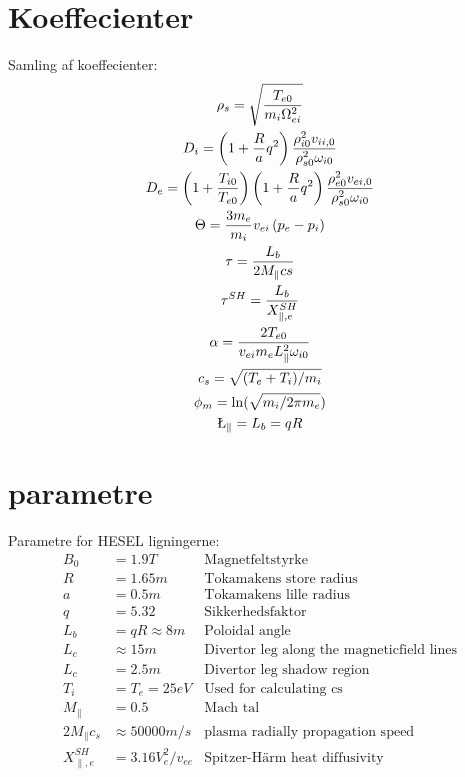 \documentclass{article}
\begin{document}
\section{Koeffecienter}
Samling af koeffecienter:
\begin{gather*}
    \rho_s = \sqrt{\frac{T_{e0}}{m_i\Omega_{ei}^2}}\\
    D_i = \left(1 + \frac{R}{a}q^2\right)\frac{\rho_{i0}^2v_{ii,0}}{\rho_{s0}^2\omega_{i0}}\\
    D_e = \left(1 + \frac{T_{i0}}{T_{e0}}\right) \left(1 + \frac{R}{a}q^2\right)\frac{\rho_{e0}^2v_{ei,0}}{\rho_{s0}^2\omega_{i0}}\\
    \Theta = \frac{3m_e}{m_i}v_{ei}\left(p_e - p_i\right)\\
    \tau = \frac{L_b}{2M_\parallel cs} \\
    \tau^{SH} = \frac{L_b}{X_{\parallel,e}^{SH}} \\
    \alpha = \frac{2T_{e0}}{v_{ei}m_eL^2_\parallel\omega_{i0}}\\
    c_s = \sqrt{(T_e + T_i)/m_i} \\
    \phi_m = \ln(\sqrt{m_i/2\pi m_e})\\
    \L_\parallel = L_b = qR\\
\end{gather*}


\section{parametre}
Parametre for HESEL ligningerne:
\begin{align*}
    B_0 &= 1.9T &\text{Magnetfeltstyrke} \\
    R &= 1.65m &\text{Tokamakens store radius} \\
    a &= 0.5m &\text{Tokamakens lille radius} \\
    q &= 5.32 &\text{Sikkerhedsfaktor} \\
    L_b &= qR \approx 8m  &\text{Poloidal angle}\\
    L_c &\approx 15m &\text{Divertor leg along the magneticfield lines}\\    
    L_c &= 2.5m &\text{Divertor leg shadow region}\\
    T_i &= T_e = 25eV &\text{Used for calculating cs} \\
    M_\parallel &= 0.5 &\text{Mach tal}\\
    2M_\parallel c_s &\approx 50000 m/s &\text{plasma radially propagation speed}\\
    X_{\parallel,e}^{SH} &= 3.16V_e^2/v_{ee} &\text{Spitzer-Härm heat diffusivity}\\
\end{align*}
\end{document}
